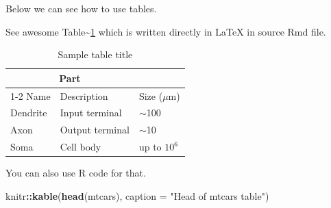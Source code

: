 \documentclass{article}
\newenvironment{Shaded}{\begin{snugshade}}{\end{snugshade}}
\newcommand{\AttributeTok}[1]{\textcolor[rgb]{0.13,0.29,0.53}{#1}}
\newcommand{\FunctionTok}[1]{\textcolor[rgb]{0.13,0.29,0.53}{\textbf{#1}}}
\newcommand{\NormalTok}[1]{#1}
\newcommand{\SpecialCharTok}[1]{\textcolor[rgb]{0.81,0.36,0.00}{\textbf{#1}}}
\newcommand{\StringTok}[1]{\textcolor[rgb]{0.31,0.60,0.02}{#1}}
\begin{document}
Below we can see how to use tables.

See awesome Table\textasciitilde{}\ref{tab:table} which is written
directly in LaTeX in source Rmd file.

\begin{table}
 \caption{Sample table title}
  \centering
  \begin{tabular}{lll}
    \toprule
    \multicolumn{2}{c}{Part}                   \\
    \cmidrule(r){1-2}
    Name     & Description     & Size ($\mu$m) \\
    \midrule
    Dendrite & Input terminal  & $\sim$100     \\
    Axon     & Output terminal & $\sim$10      \\
    Soma     & Cell body       & up to $10^6$  \\
    \bottomrule
  \end{tabular}
  \label{tab:table}
\end{table}

You can also use R code for that.

\begin{Shaded}
\begin{Highlighting}[]
\NormalTok{knitr}\SpecialCharTok{::}\FunctionTok{kable}\NormalTok{(}\FunctionTok{head}\NormalTok{(mtcars), }\AttributeTok{caption =} \StringTok{"Head of mtcars table"}\NormalTok{)}
\end{Highlighting}
\end{Shaded}
\end{document}
